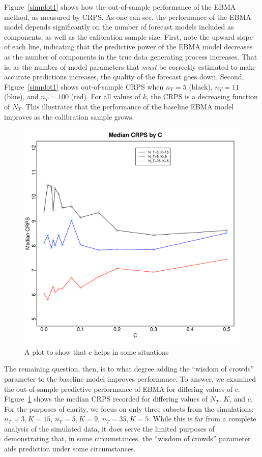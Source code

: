 \documentclass[12pt,fullpage,endnotes]{article}
\begin{document}
Figure~\ref{simplot1} shows how the out-of-sample performance of the
EBMA method, as measured by CRPS. As one can see, the performance of the EBMA model depends significantly on the number of forecast models included as components, as well as the calibration sample size. First, note the upward slope of each line, indicating that the
predictive power of the EBMA model decreases as the number of components in
the true data generating process increases. That is, as the number of
model parameters that \textit{must} be correctly estimated to make
accurate predictions increases, the quality of the forecast goes down.
Second, Figure~\ref{simplot1} shows out-of-sample CRPS when $n_T=5$
(black), $n_T=11$ (blue), and $n_T=100$ (red).  For all values of $k$,
the CRPS is a decreasing function of $N_T$.  This illustrates that the
performance of the baseline EBMA model improves as the calibration
sample grows.

\begin{figure}[ht]
\caption{A plot to show that $c$ helps in some situations}
\label{simplot2}
\centering
\includegraphics[scale=.8]{SimTemp2}
\end{figure}

The remaining question, then, is to what degree adding the ``wisdom of
crowds'' parameter to the baseline model improves performance.  To
answer, we examined the out-of-sample predictive performance of EBMA
for differing values of $c$. Figure~\ref{simplot2} shows the median
CRPS recorded for differing values of $N_T$, $K$, and $c$.  For the
purposes of clarity, we focus on only three subsets from the
simulations: $n_T=3, K=15$, $n_T=5, K=9$, $n_T=35, K=5$.  While this
is far from a complete analysis of the simulated data, it does serve
the limited purposes of demonstrating that, in some circumstances, the
``wisdom of crowds'' parameter aids prediction under some
circumstances.
\end{document}
